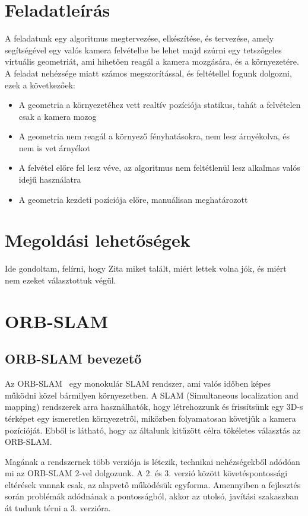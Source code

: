 \section{Feladatleírás}

A feladatunk egy algoritmus megtervezése, elkészítése, és tervezése, amely segítségével egy valós kamera felvételbe be lehet majd szúrni egy tetszőgeles virtuális geometriát, ami hihetően reagál a kamera mozgására, és a környezetére.
A feladat nehézsége miatt számos megszorítással, és feltétellel fogunk dolgozni, ezek a következőek:

\begin{itemize}
	\item A geometria a környezetéhez vett realtív pozíciója statikus, tahát a felvételen csak a kamera mozog
	\item A geometria nem reagál a környező fényhatásokra, nem lesz árnyékolva, és nem is vet árnyékot
	\item A felvétel előre fel lesz véve, az algoritmus nem feltétlenül lesz alkalmas valós idejű használatra
	\item A geometria kezdeti pozíciója előre, manuálisan meghatározott
\end{itemize}

\section{Megoldási lehetőségek}

Ide gondoltam, felírni, hogy Zita miket talált, miért lettek volna jók, és miért nem ezeket választottuk végül.

\section{ORB-SLAM}

\subsection{ORB-SLAM bevezető}

Az ORB-SLAM~\cite{7219438} egy monokulár SLAM rendszer, ami valós időben képes működni közel bármilyen környezetben. 
A SLAM (Simultaneous localization and mapping) rendszerek arra használhatók, hogy létrehozzunk és frissítsünk egy 3D-s térképet egy ismeretlen környezetről, miközben folyamatosan követjük a kamera pozícióját. 
Ebből is látható, hogy az általunk kitűzött célra tökéletes választás az ORB-SLAM.

Magának a rendszernek több verziója is létezik, technikai nehézségekből adódóan mi az ORB-SLAM 2-vel dolgozunk. 
A 2. és 3. verzió között követéspontossági eltérések vannak csak, az alapvető működésük egyforma. 
Amennyiben a fejlesztés során problémák adódnának a pontosságból, akkor az utolsó, javítási szakaszban át tudunk térni a 3. verzióra.


